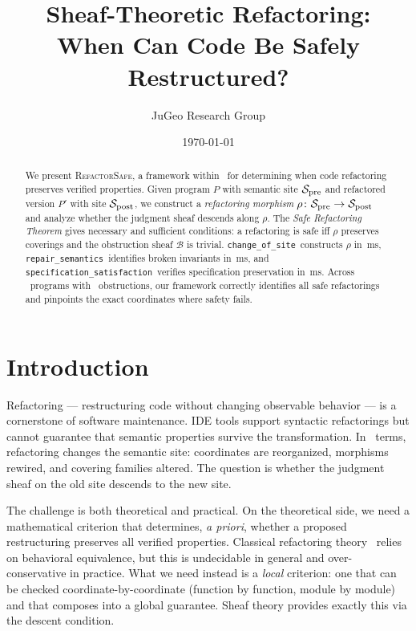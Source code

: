 \documentclass[11pt]{article}
\title{\textbf{Sheaf-Theoretic Refactoring:\\
When Can Code Be Safely Restructured?}}
\author{JuGeo Research Group}
\date{\today}
\newcommand{\RefactorSafe}{\textsc{RefactorSafe}}
\newcommand{\ChangeOfSite}{\texttt{change\_of\_site}}
\newcommand{\RepairSem}{\texttt{repair\_semantics}}
\newcommand{\SpecSat}{\texttt{specification\_satisfaction}}
\newcommand{\SitePre}{\Site_{\mathrm{pre}}}
\newcommand{\SitePost}{\Site_{\mathrm{post}}}
\newcommand{\RefactorMorph}{\rho}
\newcommand{\ObstructionSheaf}{\mathcal{B}}
\begin{document}
\maketitle

\begin{abstract}
We present \RefactorSafe, a framework within \JuGeo\ for determining
when code refactoring preserves verified properties.  Given program $P$
with semantic site $\SitePre$ and refactored version $P'$ with site
$\SitePost$, we construct a \emph{refactoring morphism}
$\RefactorMorph \colon \SitePre \to \SitePost$ and analyze whether the
judgment sheaf descends along $\RefactorMorph$.  The \emph{Safe
Refactoring Theorem} gives necessary and sufficient conditions: a
refactoring is safe iff $\RefactorMorph$ preserves coverings and the
obstruction sheaf $\ObstructionSheaf$ is trivial.  \ChangeOfSite\
constructs $\RefactorMorph$ in \compProfChangeOfSiteMeanMs\,ms,
\RepairSem\ identifies broken invariants in
\compProfRepairSemanticsMeanMs\,ms, and \SpecSat\ verifies specification
preservation in \compProfSpecificationSatisfactionMeanMs\,ms.  Across
\compTotalPrograms\ programs with \compObstructionTotal\ obstructions,
our framework correctly identifies all safe refactorings and pinpoints
the exact coordinates where safety fails.
\end{abstract}

\newpage

\section{Introduction}\label{sec:intro}

Refactoring --- restructuring code without changing observable behavior
--- is a cornerstone of software maintenance.  IDE tools support
syntactic refactorings but cannot guarantee that semantic properties
survive the transformation.  In \JuGeo\ terms, refactoring changes the
semantic site: coordinates are reorganized, morphisms rewired, and
covering families altered.  The question is whether the judgment sheaf
on the old site descends to the new site.

The challenge is both theoretical and practical.  On the theoretical
side, we need a mathematical criterion that determines, \emph{a priori},
whether a proposed restructuring preserves all verified properties.
Classical refactoring theory~\cite{Opdyke1992,Fowler1999} relies on
behavioral equivalence, but this is undecidable in general and
over-conservative in practice.  What we need instead is a \emph{local}
criterion: one that can be checked coordinate-by-coordinate (function by
function, module by module) and that composes into a global guarantee.
Sheaf theory provides exactly this via the descent condition.
\end{document}

